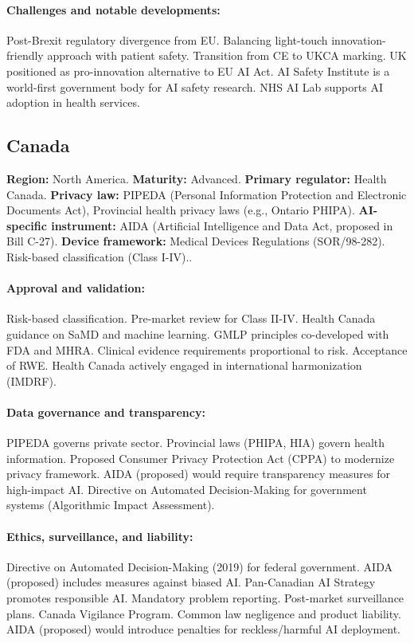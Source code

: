 {\paragraph{Challenges and notable developments:}
Post-Brexit regulatory divergence from EU. Balancing light-touch innovation-friendly approach with patient safety. Transition from CE to UKCA marking.
UK positioned as pro-innovation alternative to EU AI Act. AI Safety Institute is a world-first government body for AI safety research. NHS AI Lab supports AI adoption in health services.


\subsection{Canada}
\textbf{Region:} North America.
\textbf{Maturity:} Advanced.
\textbf{Primary regulator:} Health Canada.
\textbf{Privacy law:} PIPEDA (Personal Information Protection and Electronic Documents Act), Provincial health privacy laws (e.g., Ontario PHIPA).
\textbf{AI-specific instrument:} AIDA (Artificial Intelligence and Data Act, proposed in Bill C-27).
\textbf{Device framework:} Medical Devices Regulations (SOR/98-282). Risk-based classification (Class I-IV)..

\paragraph{Approval and validation:}
Risk-based classification. Pre-market review for Class II-IV. Health Canada guidance on SaMD and machine learning. GMLP principles co-developed with FDA and MHRA.
Clinical evidence requirements proportional to risk. Acceptance of RWE. Health Canada actively engaged in international harmonization (IMDRF).

\paragraph{Data governance and transparency:}
PIPEDA governs private sector. Provincial laws (PHIPA, HIA) govern health information. Proposed Consumer Privacy Protection Act (CPPA) to modernize privacy framework.
AIDA (proposed) would require transparency measures for high-impact AI. Directive on Automated Decision-Making for government systems (Algorithmic Impact Assessment).

\paragraph{Ethics, surveillance, and liability:}
Directive on Automated Decision-Making (2019) for federal government. AIDA (proposed) includes measures against biased AI. Pan-Canadian AI Strategy promotes responsible AI.
Mandatory problem reporting. Post-market surveillance plans. Canada Vigilance Program.
Common law negligence and product liability. AIDA (proposed) would introduce penalties for reckless/harmful AI deployment.

}
